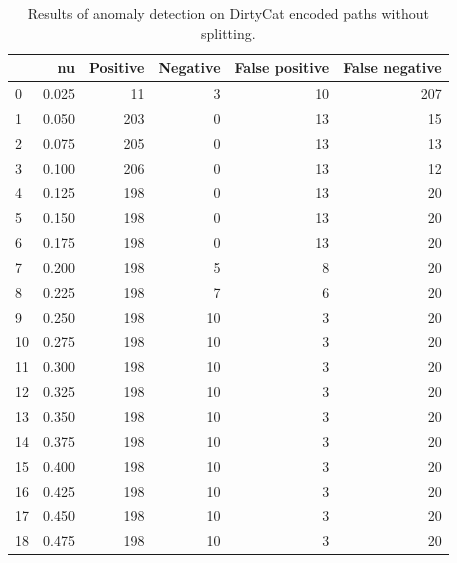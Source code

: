 \documentclass[a4paper,twoside,12pt]{book}
\begin{document}
\begin{appendices}
\begin{table}
	\centering
	\caption{Results of anomaly detection on DirtyCat encoded paths without splitting.}
	\label{id:tab:ocsvmOnDirtyCatFullPaths}
	\begin{tabular}{lrrrrr}
		\toprule
		{} &     nu &  Positive &  Negative &  False positive &  False negative \\
		\midrule
		0  &  0.025 &        11 &         3 &              10 &             207 \\
		1  &  0.050 &       203 &         0 &              13 &              15 \\
		2  &  0.075 &       205 &         0 &              13 &              13 \\
		3  &  0.100 &       206 &         0 &              13 &              12 \\
		4  &  0.125 &       198 &         0 &              13 &              20 \\
		5  &  0.150 &       198 &         0 &              13 &              20 \\
		6  &  0.175 &       198 &         0 &              13 &              20 \\
		7  &  0.200 &       198 &         5 &               8 &              20 \\
		8  &  0.225 &       198 &         7 &               6 &              20 \\
		9  &  0.250 &       198 &        10 &               3 &              20 \\
		10 &  0.275 &       198 &        10 &               3 &              20 \\
		11 &  0.300 &       198 &        10 &               3 &              20 \\
		12 &  0.325 &       198 &        10 &               3 &              20 \\
		13 &  0.350 &       198 &        10 &               3 &              20 \\
		14 &  0.375 &       198 &        10 &               3 &              20 \\
		15 &  0.400 &       198 &        10 &               3 &              20 \\
		16 &  0.425 &       198 &        10 &               3 &              20 \\
		17 &  0.450 &       198 &        10 &               3 &              20 \\
		18 &  0.475 &       198 &        10 &               3 &              20 \\

\end{tabular}
\end{table}
\end{appendices}
\end{document}
